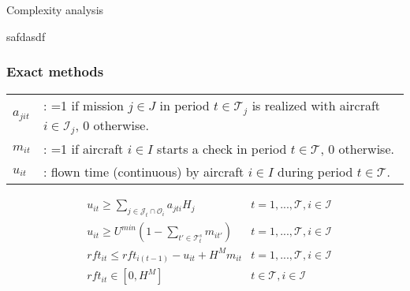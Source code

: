 \section{\firsttitle}

\begin{frame}

\begin{block}{Complexity analysis}

safdasdf

\end{block}

\end{frame}

\begin{frame}
\frametitle{\textbf{Exact methods}}

\begin{tabular}{p{15mm}p{110mm}}
  $a_{jit}$ &  :  =1 if mission $j \in J$ in period $t \in \mathcal{T}_j$ is realized with aircraft $i \in \mathcal{I}_j$, 0 otherwise.  \\
  $m_{it}$   & :  =1 if aircraft $i \in I$ starts a check in period $t \in \mathcal{T}$, 0 otherwise.  \\
  $u_{it}$    &:  flown time (continuous) by aircraft $i \in I$ during period $t \in \mathcal{T}$. \\
\end{tabular}

\begin{align}
 & u_{it} \geq \sum_{j \in \mathcal{J}_t \cap \mathcal{O}_i} a_{jti} H_j 
    & t =1, ..., \mathcal{T}, i \in \mathcal{I} \label{eq:flight1}\\
 & u_{it} \geq U^{min} (1 - \sum_{t' \in \mathcal{T}^s_t} m_{it'})
    & t =1, ..., \mathcal{T}, i \in \mathcal{I} \label{eq:flight2}\\
 & rft_{it} \leq rft_{i(t-1)} - u_{it} + H^M m_{it}
    & t =1, ..., \mathcal{T}, i \in \mathcal{I} \label{eq:first_rft_upper}\\
& rft_{it} \in [0,H^M]
      & t \in \mathcal{T}, i \in \mathcal{I} \label{eq:first-mu}
\end{align}

\end{frame}

\begin{frame}
\frametitle{\textbf{}}


\end{frame}